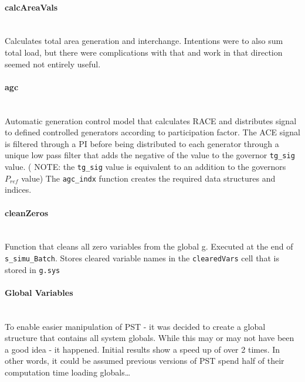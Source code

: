 \documentclass[12pt]{article}
\begin{document}
\paragraph{calcAreaVals} \ \\
Calculates total area generation and interchange.
Intentions were to also sum total load, but there were complications with that and work in that direction seemed not entirely useful.

\paragraph{agc} \ \\
Automatic generation control model that calculates RACE and distributes signal to defined controlled generators according to participation factor.
The ACE signal is filtered through a PI before being distributed to each generator through a unique low pass filter that adds the negative of the value to the governor \verb|tg_sig| value.
( NOTE: the \verb|tg_sig| value is equivalent to an addition to the governors $P_{ref}$ value)
The \verb|agc_indx| function creates the required data structures and indices.

\paragraph{cleanZeros} \ \\
Function that cleans all zero variables from the global g.
Executed at the end of \verb|s_simu_Batch|.
Stores cleared variable names in the \verb|clearedVars| cell that is stored in \verb|g.sys|



\pagebreak
\paragraph{Global Variables} \ \\
To enable easier manipulation of PST - it was decided to create a global structure that contains all system globals.
While this may or may not have been a good idea - it happened.
Initial results show a speed up of over 2 times.
In other words, it could be assumed previous versions of PST spend half of their computation time loading globals\ldots
\end{document}
